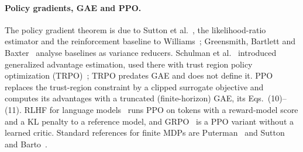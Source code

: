 \documentclass[11pt,a4paper]{article}
\begin{document}
\paragraph{Policy gradients, GAE and PPO.}
The policy gradient theorem is due to Sutton et al.~\cite{sutton2000policy}, the likelihood-ratio estimator and the reinforcement baseline to Williams~\cite{williams1992simple}; Greensmith, Bartlett and Baxter~\cite{greensmith2004variance} analyse baselines as variance reducers.
Schulman et al.~\cite{schulman2016gae} introduced generalized advantage estimation, used there with trust region policy optimization (TRPO)~\cite{schulman2015trpo}; TRPO predates GAE and does not define it.
PPO~\cite{schulman2017ppo} replaces the trust-region constraint by a clipped surrogate objective and computes its advantages with a truncated (finite-horizon) GAE, its Eqs.~(10)--(11).
RLHF for language models~\cite{ziegler2019finetuning,ouyang2022instructgpt} runs PPO on tokens with a reward-model score and a KL penalty to a reference model, and GRPO~\cite{shao2024deepseekmath} is a PPO variant without a learned critic.
Standard references for finite MDPs are Puterman~\cite{puterman1994markov} and Sutton and Barto~\cite{sutton2018reinforcement}.
\end{document}
